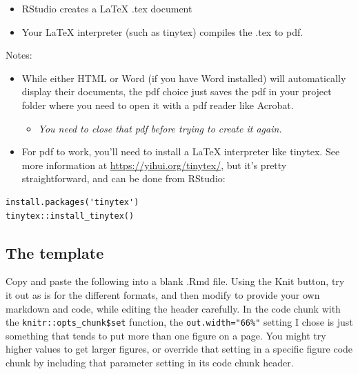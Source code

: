 \documentclass[
]{book}
\providecommand{\tightlist}{%
  \setlength{\itemsep}{0pt}\setlength{\parskip}{0pt}}
\begin{document}
\begin{itemize}
\tightlist
\item
  RStudio creates a LaTeX .tex document
\item
  Your LaTeX interpreter (such as tinytex) compiles the .tex to pdf.
\end{itemize}

Notes:

\begin{itemize}
\tightlist
\item
  While either HTML or Word (if you have Word installed) will automatically display their documents, the pdf choice just saves the pdf in your project folder where you need to open it with a pdf reader like Acrobat.

  \begin{itemize}
  \tightlist
  \item
    \emph{You need to close that pdf before trying to create it again.}
  \end{itemize}
\item
  For pdf to work, you'll need to install a LaTeX interpreter like tinytex. See more information at \url{https://yihui.org/tinytex/}, but it's pretty straightforward, and can be done from RStudio:
\end{itemize}

\begin{verbatim}
install.packages('tinytex')
tinytex::install_tinytex()
\end{verbatim}

\hypertarget{the-template}{%
\subsection{The template}\label{the-template}}

Copy and paste the following into a blank .Rmd file. Using the Knit button, try it out as is for the different formats, and then modify to provide your own markdown and code, while editing the header carefully. In the code chunk with the \texttt{knitr::opts\_chunk\$set} function, the \texttt{out.width="66\%"} setting I chose is just something that tends to put more than one figure on a page. You might try higher values to get larger figures, or override that setting in a specific figure code chunk by including that parameter setting in its code chunk header.
\end{document}
